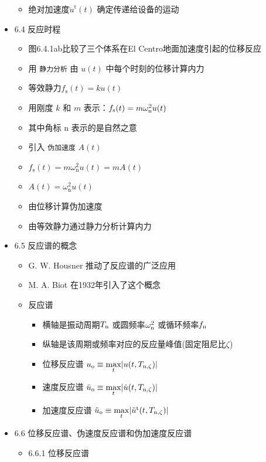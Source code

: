 \documentclass[11pt]{article}
\begin{document}
\begin{itemize}
\begin{itemize}
\item 绝对加速度\(\ddot{u}^{\mathrm{t}}(t)\) 确定传递给设备的运动
\end{itemize}
\item 6.4 反应时程
\label{sec:orgdc64c20}
\begin{itemize}
\item 图6.4.1ab比较了三个体系在El Centro地面加速度引起的位移反应
\item 用 \texttt{静力分析} 由 \(u(t)\) 中每个时刻的位移计算内力
\item 等效静力\(f_{\mathrm{s}}(t) = ku(t)\)
\item 用刚度 \(k\) 和 \(m\) 表示：\(f_{\mathrm{s}}(t) = m\omega^{2}_\mathrm{n} u(t)\)
\item 其中角标 \(\mathrm{n}\) 表示的是自然之意
\item 引入 \texttt{伪加速度} \(A(t)\)
\item \(f_{\mathrm{s}}(t) = m\omega^{2}_{\mathrm{n}}u(t) = m A(t)\)
\item \(A(t) = \omega^{2}_{\mathrm{n}}u(t)\)
\item 由位移计算伪加速度
\item 由等效静力通过静力分析计算内力
\end{itemize}
\item 6.5 反应谱的概念
\label{sec:org19b5bc7}
\begin{itemize}
\item G. W. Housner 推动了反应谱的广泛应用
\item M. A. Biot 在1932年引入了这个概念
\item 反应谱
\begin{itemize}
\item 横轴是振动周期\(T_\mathrm{n}\) 或圆频率\(\omega^{2}_\mathrm{n}\) 或循环频率\(f_\mathrm{n}\)
\item 纵轴是该周期或频率对应的反应量峰值(固定阻尼比\(\zeta\))
\item 位移反应谱 \(u_\mathrm{o} \equiv \underset{t}{\mathrm{max}} \lvert u(t,T_{\mathrm{n},\zeta}) \rvert\)
\item 速度反应谱 \(\ddot{u}_\mathrm{o} \equiv \underset{t}{\mathrm{max}} \lvert \dot{u}(t,T_{\mathrm{n},\zeta}) \rvert\)
\item 加速度反应谱 \(\ddot{u}_\mathrm{o} \equiv \underset{t}{\mathrm{max}} \lvert \ddot{u}^{\mathrm{t}}(t,T_{\mathrm{n},\zeta}) \rvert\)
\end{itemize}
\end{itemize}
\item 6.6 位移反应谱、伪速度反应谱和伪加速度反应谱
\label{sec:org2bbb07c}
\begin{itemize}
\item 6.6.1 位移反应谱

\end{itemize}
\end{itemize}
\end{document}

